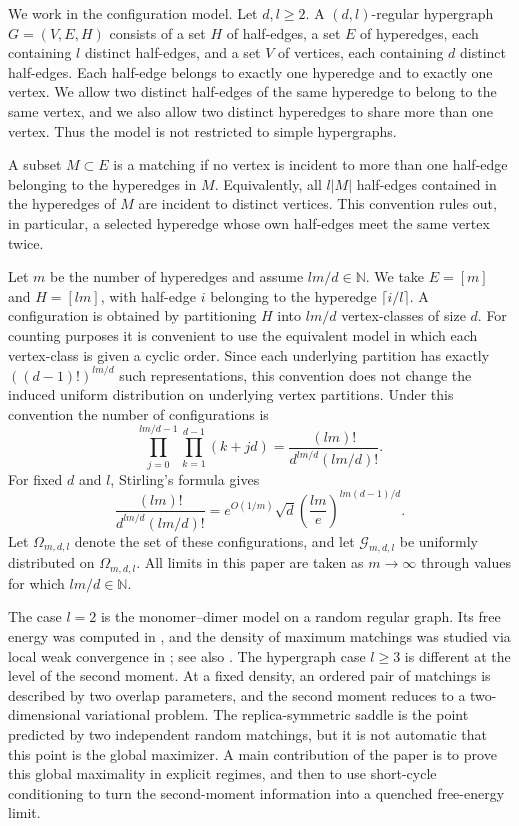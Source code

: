\documentclass[11pt]{amsart}
\theoremstyle{plain}
\numberwithin{equation}{section}
\numberwithin{theorem}{section}
\numberwithin{figure}{section}
\begin{document}
We work in the configuration model.  Let $d,l\ge2$.  A $(d,l)$-regular
hypergraph $G=(V,E,H)$ consists of a set $H$ of half-edges, a set $E$ of
hyperedges, each containing $l$ distinct half-edges, and a set $V$ of vertices,
each containing $d$ distinct half-edges.  Each half-edge belongs to exactly one
hyperedge and to exactly one vertex.  We allow two distinct half-edges of the
same hyperedge to belong to the same vertex, and we also allow two distinct
hyperedges to share more than one vertex.  Thus the model is not restricted to
simple hypergraphs.

A subset $M\subset E$ is a matching if no vertex is incident to more than one
half-edge belonging to the hyperedges in $M$.  Equivalently, all $l|M|$
half-edges contained in the hyperedges of $M$ are incident to distinct vertices.
This convention rules out, in particular, a selected hyperedge whose own
half-edges meet the same vertex twice.

Let $m$ be the number of hyperedges and assume $lm/d\in\mathbb N$.  We take
$E=[m]$ and $H=[lm]$, with half-edge $i$ belonging to the hyperedge
$\lceil i/l\rceil$.  A configuration is obtained by partitioning $H$ into $lm/d$
vertex-classes of size $d$.  For counting purposes it is convenient to use the
equivalent model in which each vertex-class is given a cyclic order.  Since each
underlying partition has exactly $((d-1)!)^{lm/d}$ such representations, this
convention does not change the induced uniform distribution on underlying vertex
partitions.  Under this convention the number of configurations is
\begin{equation}\label{dlr}
  \prod_{j=0}^{lm/d-1}\prod_{k=1}^{d-1}(k+jd)
  =\frac{(lm)!}{d^{lm/d}(lm/d)!} .
\end{equation}
For fixed $d$ and $l$, Stirling's formula gives
\[
  \frac{(lm)!}{d^{lm/d}(lm/d)!}
  =e^{O(1/m)}\sqrt d\left(\frac{lm}{e}\right)^{lm(d-1)/d} .
\]
Let $\Omega_{m,d,l}$ denote the set of these configurations, and let
$\mathcal G_{m,d,l}$ be uniformly distributed on $\Omega_{m,d,l}$.  All limits in
this paper are taken as $m\to\infty$ through values for which $lm/d\in\mathbb N$.

The case $l=2$ is the monomer--dimer model on a random regular graph.  Its free
energy was computed in \cite{AC14}, and the density of maximum matchings was
studied via local weak convergence in \cite{EL10,BLS13}; see also
\cite{AS04,DM10}.  The hypergraph case $l\ge3$ is different at the level of the
second moment.  At a fixed density, an ordered pair of matchings is described by
two overlap parameters, and the second moment reduces to a two-dimensional
variational problem.  The replica-symmetric saddle is the point predicted by two
independent random matchings, but it is not automatic that this point is the
global maximizer.  A main contribution of the paper is to prove this global
maximality in explicit regimes, and then to use short-cycle conditioning to turn
the second-moment information into a quenched free-energy limit.
\end{document}
